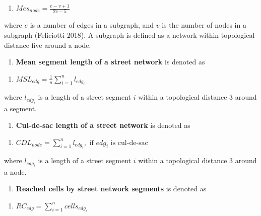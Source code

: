 \documentclass[
  letterpaper,
  DIV=11,
  numbers=noendperiod]{scrartcl}
\providecommand{\tightlist}{%
  \setlength{\itemsep}{0pt}\setlength{\parskip}{0pt}}\usepackage{longtable,booktabs,array}
\begin{document}
\begin{enumerate}
\def\labelenumi{(\arabic{enumi})}
\setcounter{enumi}{39}
\tightlist
\item
  \(Mes_{node}= \frac{e-v+1}{2 v-5}\)
\end{enumerate}

where \(e\) is a number of edges in a subgraph, and \(v\) is the number
of nodes in a subgraph (Feliciotti 2018). A subgraph is defined as a
network within topological distance five around a node.

\begin{enumerate}
\def\labelenumi{\arabic{enumi}.}
\setcounter{enumi}{40}
\tightlist
\item
  \textbf{Mean segment length of a street network} is denoted as
\end{enumerate}

\begin{enumerate}
\def\labelenumi{(\arabic{enumi})}
\setcounter{enumi}{40}
\tightlist
\item
  \(MSL_{edg} = \frac{1}{n} \sum_{i=1}^{n} l_{edg_i}\)
\end{enumerate}

where \(l_{edg_i}\) is a length of a street segment \(i\) within a
topological distance 3 around a segment.

\begin{enumerate}
\def\labelenumi{\arabic{enumi}.}
\setcounter{enumi}{41}
\tightlist
\item
  \textbf{Cul-de-sac length of a street network} is denoted as
\end{enumerate}

\begin{enumerate}
\def\labelenumi{(\arabic{enumi})}
\setcounter{enumi}{41}
\tightlist
\item
  \(CDL_{node} = \sum_{i=1}^{n} l_{edg_i}, \text { if }edg_i \text { is cul-de-sac}\)
\end{enumerate}

where \(l_{edg_i}\) is a length of a street segment \(i\) within a
topological distance 3 around a node.

\begin{enumerate}
\def\labelenumi{\arabic{enumi}.}
\setcounter{enumi}{42}
\tightlist
\item
  \textbf{Reached cells by street network segments} is denoted as
\end{enumerate}

\begin{enumerate}
\def\labelenumi{(\arabic{enumi})}
\setcounter{enumi}{42}
\tightlist
\item
  \(RC_{edg} = \sum_{i=1}^{n} cells_{edg_i}\)
\end{enumerate}
\end{document}
